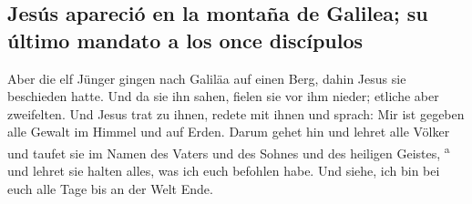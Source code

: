 \hypertarget{jesuxfas-apareciuxf3-en-la-montauxf1a-de-galilea-su-uxfaltimo-mandato-a-los-once-discuxedpulos}{%
\subsection{Jesús apareció en la montaña de Galilea; su último mandato a
los once
discípulos}\label{jesuxfas-apareciuxf3-en-la-montauxf1a-de-galilea-su-uxfaltimo-mandato-a-los-once-discuxedpulos}}

 Aber die elf Jünger gingen nach Galiläa auf einen Berg,
dahin Jesus sie beschieden hatte.  Und da sie ihn sahen,
fielen sie vor ihm nieder; etliche aber zweifelten.  Und
Jesus trat zu ihnen, redete mit ihnen und sprach: Mir ist gegeben alle
Gewalt im Himmel und auf Erden.  Darum gehet hin und
lehret alle Völker und taufet sie im Namen des Vaters und des Sohnes und
des heiligen Geistes, \textsuperscript{a}  und lehret sie
halten alles, was ich euch befohlen habe. Und siehe, ich bin bei euch
alle Tage bis an der Welt Ende.
